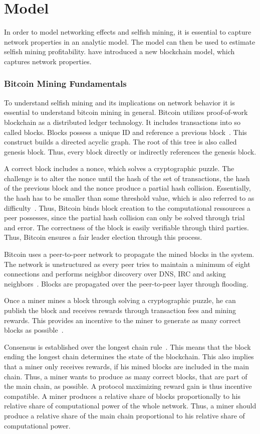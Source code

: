 \chapter{Model}\label{chap:model}
In order to model networking effects and selfish mining, it is essential to capture network properties in an analytic model. The model can then be used to estimate selfish mining profitability.
\citeauthor{gopalan} have introduced a new blockchain model, which captures network properties.
\subsection{Bitcoin Mining Fundamentals}
To understand selfish mining and its implications on network behavior it is essential to understand bitcoin mining in general.
Bitcoin utilizes proof-of-work blockchain as a distributed ledger technology.
It includes transactions into so called blocks. Blocks possess a unique ID and reference a previous block~\cite{tschorsch}. This construct builds a directed acyclic graph. The root of this tree is also called genesis block. Thus, every block directly or indirectly references the genesis block.

A correct block includes a nonce, which solves a cryptographic puzzle. The challenge is to alter the nonce until the hash of the set of transactions, the hash of the previous block and the nonce produce a partial hash collision. Essentially, the hash has to be smaller than some threshold value, which is also referred to as difficulty~\cite{tschorsch}.
Thus, Bitcoin binds block creation to the computational ressources a peer possesses, since the partial hash collision can only be solved through trial and error. The correctness of the block is easily verifiable through third parties. Thus, Bitcoin ensures a fair leader election through this process.

Bitcoin uses a peer-to-peer network to propagate the mined blocks in the system. The network is unstructured as every peer tries to maintain a minimum of eight connections and performs neighbor discovery over DNS, IRC and asking neighbors~\cite{tschorsch}. Blocks are propagated over the peer-to-peer layer through flooding.

Once a miner mines a block through solving a cryptographic puzzle, he can publish the block and receives rewards through transaction fees and mining rewards. This provides an incentive to the miner to generate as many correct blocks as possible~\cite{1}.

Consensus is established over the longest chain rule~\cite{1}. This means that the block ending the longest chain determines the state of the blockchain. This also implies that a miner only receives rewards, if his mined blocks are included in the main chain. Thus, a miner wants to produce as many correct blocks, that are part of the main chain, as possible. A protocol maximizing reward gain is thus incentive compatible.
A miner produces a relative share of blocks proportionally to his relative share of computational power of the whole network. Thus, a miner should produce a relative share of the main chain proportional to his relative share of computational power.

